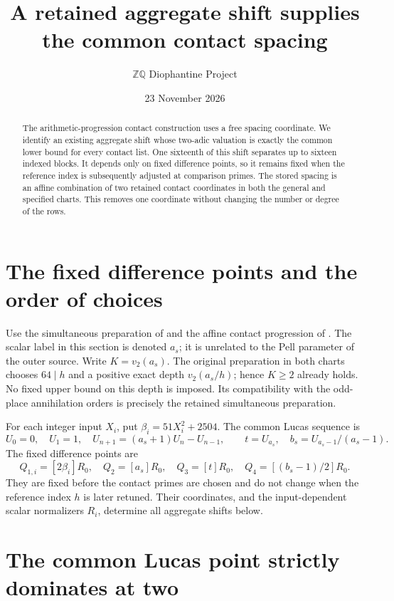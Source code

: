 \documentclass[11pt]{article}
\title{A retained aggregate shift supplies the common contact spacing}
\author{\(\mathbb Z\mathbb Q\) Diophantine Project}
\date{23 November 2026}
\begin{document}
\maketitle

\begin{abstract}
The arithmetic-progression contact construction uses a free spacing
coordinate. We identify an existing aggregate shift whose two-adic
valuation is exactly the common lower bound for every contact list.
One sixteenth of this shift separates up to sixteen indexed blocks.
It depends only on fixed difference points, so it remains fixed when
the reference index is subsequently adjusted at comparison primes.
The stored spacing is an affine combination of two retained contact
coordinates in both the general and specified charts. This removes
one coordinate without changing the number or degree of the rows.
\end{abstract}

\section{The fixed difference points and the order of choices}

Use the simultaneous preparation of \cite{Shared} and the affine
contact progression of \cite{Progression}. The scalar label in this
section is denoted \(a_s\); it is unrelated to the Pell parameter
of the outer source. Write \(K=v_2(a_s)\). The original preparation
in both charts \cite{Scalar,Shared}
chooses \(64\mid h\) and a positive exact depth
\(v_2(a_s/h)\); hence \(K\ge2\) already holds. No fixed upper
bound on this depth is imposed. Its compatibility with the odd-place
annihilation orders is precisely the retained simultaneous preparation.

For each integer input \(X_i\), put \(\beta_i=51X_i^2+2504\).
The common Lucas sequence is
\[
 U_0=0,\quad U_1=1,\quad U_{n+1}=(a_s+1)U_n-U_{n-1},
 \qquad t=U_{a_s},\quad b_s=U_{a_s-1}/(a_s-1).
\]
The fixed difference points are
\[
 Q_{1,i}=[2\beta_i]R_0,\quad Q_2=[a_s]R_0,
 \quad Q_3=[t]R_0,\quad Q_4=[(b_s-1)/2]R_0.
\]
They are fixed before the contact primes are chosen and do not change
when the reference index \(h\) is later retuned. Their coordinates,
and the input-dependent scalar normalizers \(R_i\), determine all
aggregate shifts below.

\section{The common Lucas point strictly dominates at two}
\end{document}
